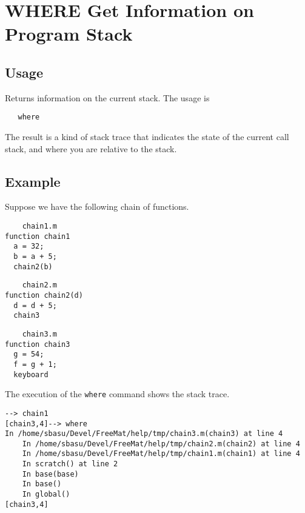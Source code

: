 \section{WHERE Get Information on Program Stack}

\subsection{Usage}

Returns information on the current stack.  The usage is
\begin{verbatim}
   where
\end{verbatim}
The result is a kind of stack trace that indicates the state
of the current call stack, and where you are relative to the
stack.
\subsection{Example}

Suppose we have the following chain of functions.
\begin{verbatim}
    chain1.m
function chain1
  a = 32;
  b = a + 5;
  chain2(b)
\end{verbatim}
\begin{verbatim}
    chain2.m
function chain2(d)
  d = d + 5;
  chain3
\end{verbatim}
\begin{verbatim}
    chain3.m
function chain3
  g = 54;
  f = g + 1;
  keyboard
\end{verbatim}
The execution of the \verb|where| command shows the stack trace.
\begin{verbatim}
--> chain1
[chain3,4]--> where
In /home/sbasu/Devel/FreeMat/help/tmp/chain3.m(chain3) at line 4
    In /home/sbasu/Devel/FreeMat/help/tmp/chain2.m(chain2) at line 4
    In /home/sbasu/Devel/FreeMat/help/tmp/chain1.m(chain1) at line 4
    In scratch() at line 2
    In base(base)
    In base()
    In global()
[chain3,4]
\end{verbatim}
